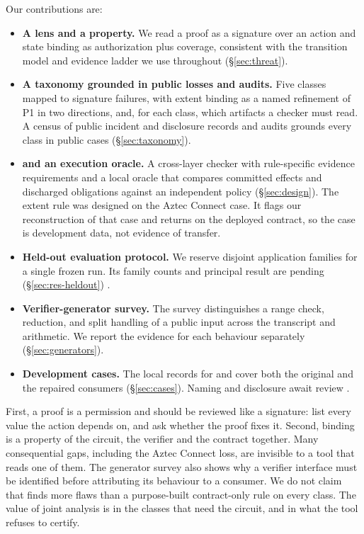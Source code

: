 Our contributions are:
\begin{itemize}
\item \textbf{A lens and a property.} We read a proof as a signature over an
  action and state binding as authorization plus coverage, consistent with
  the transition model and evidence ladder we use throughout
  (\S\ref{sec:threat}).
\item \textbf{A taxonomy grounded in public losses and audits.} Five classes
  mapped to signature failures, with extent binding as a named refinement of
  P1 in two directions, and, for each class, which artifacts a checker must
  read. A census of \RoneCases{} public incident and disclosure records and
  \RtwoAudits{} audits grounds every class in public cases
  (\S\ref{sec:taxonomy}).%
\item \textbf{\tool{} and an execution oracle.} A cross-layer checker with
  rule-specific evidence requirements and a local oracle that compares
  committed effects and discharged obligations against an independent policy
  (\S\ref{sec:design}). The extent rule was designed on the Aztec Connect
  case. It flags our reconstruction of that case and returns \UNK{} on the
  deployed contract, so the case is development data, not evidence of
  transfer.%
\item \textbf{Held-out evaluation protocol.} We reserve disjoint application
  families for a single frozen run. Its family counts and principal result
  are pending (\S\ref{sec:res-heldout}) .
\item \textbf{Verifier-generator survey.} The survey distinguishes a range
  check, reduction, and split handling of a public input across the transcript
  and arithmetic. We report the evidence for each behaviour separately
  (\S\ref{sec:generators}).
\item \textbf{Development cases.} The local records for \CaseA{} and
  \CaseB{} cover both the original and the repaired consumers
  (\S\ref{sec:cases}). Naming and disclosure await review .
\end{itemize}

First, a proof is a permission and should be reviewed like a signature: list
every value the action depends on, and ask whether the proof fixes it.
Second, binding is a property of the circuit, the verifier and the contract
together. Many consequential gaps, including the Aztec Connect loss, are
invisible to a tool that reads one of them. The generator survey also shows why a verifier interface must be
identified before attributing its behaviour to a consumer.
We do not claim that \tool{} finds more flaws than a purpose-built
contract-only rule on every class. The value of joint analysis is in the
classes that need the circuit, and in what the tool refuses to certify.
